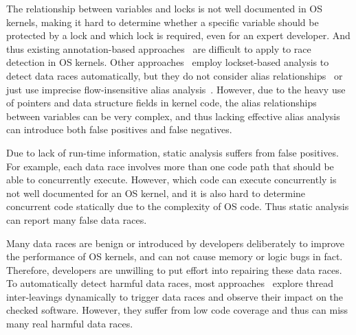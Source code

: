  The relationship between variables and locks is 
not well documented in OS kernels, making it hard to determine whether a 
specific variable should be protected by a lock and which lock is required, 
even for an expert developer. And thus existing 
annotation-based approaches~\cite{Boyapati:OOPSLA02, Anderson:PLDI08, 
Anderson:PLDI09, Zhou:MICRO19, Flanagan:PASTE01, Flanagan:PLDI00, 
Sadowski:PLATEAU14, ClangThreadSafety, Blackshear:OOPSLA18} are difficult to 
apply to race detection in OS kernels. Other approaches~\cite{Choi:PLDI02, 
Engler:SOSP03, Voung:FSE07, Pratikakis:PLDI06, Naik:PLDI06} employ 
lockset-based analysis to detect data races automatically, but they do not 
consider alias relationships~\cite{Voung:FSE07, Engler:SOSP03} or just use 
imprecise flow-insensitive alias analysis~\cite{Choi:PLDI02, 	
Pratikakis:PLDI06, Naik:PLDI06}. However, due to the heavy use of pointers and 
data structure fields in kernel code, the alias relationships between variables 
can be very complex, and thus lacking effective alias analysis can introduce 
both false positives and false negatives.

 Due to lack of run-time information, static 
analysis suffers from false positives. For example, each data race involves 
more than one code path that should be able to concurrently execute. However, 
which code can execute concurrently is not well documented for an OS kernel, 
and it is also hard to determine concurrent code statically due to the 
complexity of OS code. Thus static analysis can report many false data races.

 Many data races are benign or 
introduced by developers deliberately to improve the performance of OS kernels, 
and can not cause memory or logic bugs in fact. Therefore, developers are 
unwilling to put effort into repairing these data races. To automatically 
detect harmful data races, most approaches~\cite{Narayanasamy:PLDI07, 
Sen:PLDI08, Kasikci:SOSP13, Kasikci:ASPLOS12} explore thread inter-leavings 
dynamically to trigger data races and observe their impact on the checked 
software. However, they suffer from low code coverage and thus can miss many 
real harmful data races.



